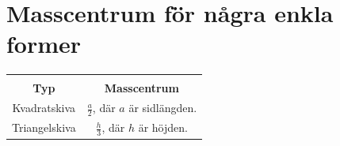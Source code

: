 \documentclass{article}
\newenvironment{ankiflashcard}[1]{}{}
\begin{document}
\newpage
\appendices

\begin{ankiflashcard}{Ange masscentrum för en kvadrat och triangel.}
    
\section{Masscentrum för några enkla former}
\large{
\begin{tabular}{|c|c|}
    \hline \\
     \textbf{Typ} &  \textbf{Masscentrum} \\
     \hline
     Kvadratskiva & $\frac a 2$, där $a$ är sidlängden. \\
     \hline
    Triangelskiva & $\frac h 3$, där $h$ är höjden. \\
    \hline
    
\end{tabular}
}
\end{ankiflashcard}
\end{document}
